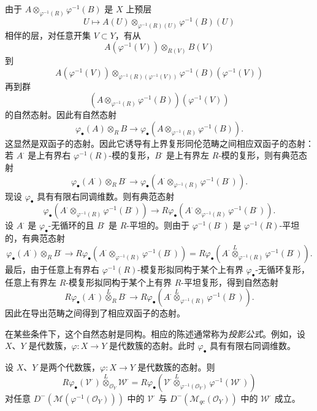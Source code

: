 由于 $A\otimes_{\varphi^{-1}(R)}\varphi^{-1}(B)$ 是 $X$ 上预层
$$U\longmapsto A(U)\otimes_{\varphi^{-1}(R)(U)}\varphi^{-1}(B)(U)$$
相伴的层，对任意开集 $V\subset Y$，有从
$$A(\varphi^{-1}(V))\otimes_{R(V)}B(V)$$
到
$$A(\varphi^{-1}(V))\otimes_{\varphi^{-1}(R)(\varphi^{-1}(V))}\varphi^{-1}(B)(\varphi^{-1}(V))$$
再到群
$$(A\otimes_{\varphi^{-1}(R)}\varphi^{-1}(B))(\varphi^{-1}(V))$$
的自然态射。因此有自然态射
$$\varphi_\bullet(A)\otimes_R B\longrightarrow\varphi_\bullet(A\otimes_{\varphi^{-1}(R)}\varphi^{-1}(B)).$$
这显然是双函子的态射。因此它诱导有上界复形同伦范畴之间相应双函子的态射：若 $A^\cdot$ 是上有界右 $\varphi^{-1}(R)$-模的复形，$B^\cdot$ 是上有界左 $R$-模的复形，则有典范态射
$$\varphi_\bullet(A^\cdot)\otimes_R B^\cdot\longrightarrow
\varphi_\bullet(A^\cdot\otimes_{\varphi^{-1}(R)}\varphi^{-1}(B^\cdot)).$$
现设 $\varphi_\bullet$ 具有有限右同调维数。则有典范态射
$$\varphi_\bullet(A^\cdot\otimes_{\varphi^{-1}(R)}\varphi^{-1}(B^\cdot))
\longrightarrow R\varphi_\bullet(A^\cdot\otimes_{\varphi^{-1}(R)}\varphi^{-1}(B^\cdot)).$$
设 $A^\cdot$ 是 $\varphi_\bullet$-无循环的且 $B^\cdot$ 是 $R$-平坦的。则由于 $\varphi^{-1}(B^\cdot)$ 是 $\varphi^{-1}(R)$-平坦的，有典范态射
$$\varphi_\bullet(A^\cdot)\otimes_R B^\cdot\longrightarrow
R\varphi_\bullet(A^\cdot\otimes_{\varphi^{-1}(R)}\varphi^{-1}(B^\cdot))
=R\varphi_\bullet(A^\cdot\overset{L}{\otimes}_{\varphi^{-1}(R)}\varphi^{-1}(B^\cdot)).$$
最后，由于任意上有界右 $\varphi^{-1}(R)$-模复形拟同构于某个上有界 $\varphi_\bullet$-无循环复形，任意上有界左 $R$-模复形拟同构于某个上有界 $R$-平坦复形，得到自然态射
$$R\varphi_\bullet(A^\cdot)\overset{L}{\otimes}_R B^\cdot\longrightarrow
R\varphi_\bullet(A^\cdot\overset{L}{\otimes}_{\varphi^{-1}(R)}\varphi^{-1}(B^\cdot)).$$
因此在导出范畴之间得到了相应双函子的态射。

在某些条件下，这个自然态射是同构。相应的陈述通常称为\emph{投影公式}。例如，设 $X$、$Y$ 是代数簇，$\varphi:X\to Y$ 是代数簇的态射。此时 $\varphi_\bullet$ 具有有限右同调维数。

\begin{proposition}\label{prop:4.4.1}
设 $X$、$Y$ 是两个代数簇，$\varphi:X\to Y$ 是代数簇的态射。则
$$R\varphi_\bullet(\mathcal{V}^\cdot)\overset{L}{\otimes}_{\mathcal{O}_Y}\mathcal{W}^\cdot
=R\varphi_\bullet(\mathcal{V}^\cdot\overset{L}{\otimes}_{\varphi^{-1}(\mathcal{O}_Y)}\varphi^{-1}(\mathcal{W}^\cdot))$$
对任意 $D^-(\mathcal{M}(\varphi^{-1}(\mathcal{O}_Y)))$ 中的 $\mathcal{V}^\cdot$ 与
$D^-(\mathcal{M}_{qc}(\mathcal{O}_Y))$ 中的 $\mathcal{W}^\cdot$ 成立。
\end{proposition}

